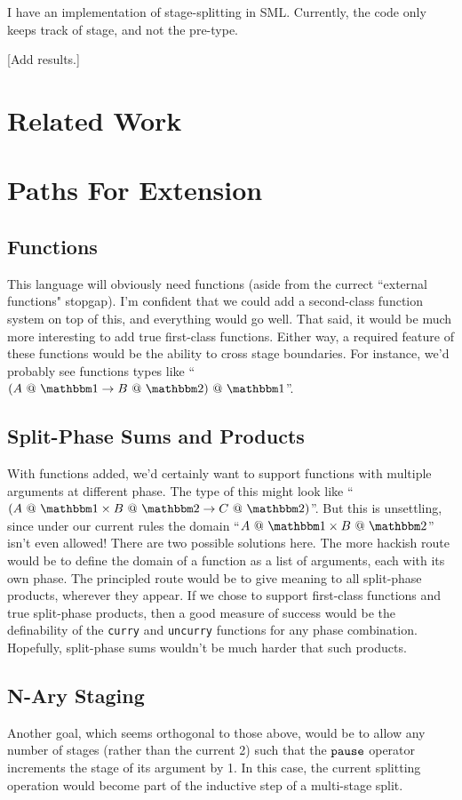 \documentclass[11pt]{article}
\makeatletter
\newcommand {\bbone} {\mathbbm 1}
\newcommand {\bbtwo} {\mathbbm 2}
\newcommand {\at} {{\tt~@~}}
\newcommand {\pause} {{\tt pause}}
\makeatother
\begin{document}
I have an implementation of stage-splitting in SML.  Currently, the code only keeps track of stage, and not the pre-type.

[Add results.]

\section{Related Work}
\label{sec:lit}

\section{Paths For Extension}
\label{sec:ext}
\subsection {Functions}
This language will obviously need functions (aside from the currect ``external functions" stopgap).  I'm confident that we could add a second-class function system on top of this, and everything would go well.  That said, it would be much more interesting to add true first-class functions.  Either way, a required feature of these functions would be the ability to cross stage boundaries.  For instance, we'd probably see functions types like ``$(A\at\bbone\to B\at\bbtwo)\at\bbone$''.
\subsection {Split-Phase Sums and Products}
With functions added, we'd certainly want to support functions with multiple arguments at different phase.  The type of this might look like ``$(A\at\bbone \times B\at \bbtwo \to C\at\bbtwo)$''.  But this is unsettling, since under our current rules the domain ``$A\at\bbone \times B\at \bbtwo$'' isn't even allowed!  There are two possible solutions here.  The more hackish route would be to define the domain of a function as a list of arguments, each with its own phase.  The principled route would be to give meaning to all split-phase products, wherever they appear.  If we chose to support first-class functions and true split-phase products, then a good measure of success would be the definability of the {\tt curry} and {\tt uncurry} functions for any phase combination. Hopefully, split-phase sums wouldn't be much harder that such products.  
\subsection {N-Ary Staging}
Another goal, which seems orthogonal to those above, would be to allow any number of stages (rather than the current 2) such that the $\pause$ operator increments the stage of its argument by 1.  In this case, the current splitting operation would become part of the inductive step of a multi-stage split.  
\end{document}
